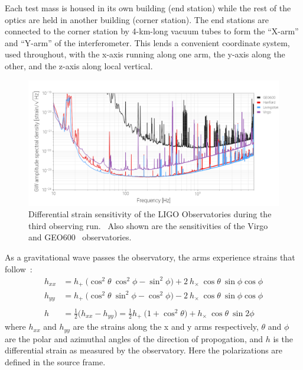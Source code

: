 \documentclass [12pt, proquest]{uwthesis}[2019]
\begin{document}
Each test mass is housed in its own building (end station) while the rest of the optics are held in another building (corner station). The end stations are connected to the corner station by 4-km-long vacuum tubes to form the ``X-arm'' and ``Y-arm'' of the interferometer. This lends a convenient coordinate system, used throughout, with the x-axis running along one arm, the y-axis along the other, and the z-axis along local vertical. 

\begin{figure}[!h]
\begin{center}
\includegraphics[width=1.05\textwidth]{LIGOSens.png}
\caption[Differential strain sensitivity of the LIGO and Virgo Observatories]{Differential strain sensitivity of the LIGO Observatories during the third observing run.~\cite{LIGOopen} Also shown are the sensitivities of the Virgo~\cite{virgo} and GEO600~\cite{geo} observatories.}
\label{LIGO_Strain}
\end{center}
\end{figure}

As a gravitational wave passes the observatory, the arms experience strains that follow~\cite{GWBook}:
\begin{align}
h_{xx}&=h_+\ \big( \cos^2\theta\ \cos^2\phi-\sin^2\phi \big)+2\ h_\times\ \cos \theta\ \sin \phi \cos \phi \\
h_{yy}&=h_+\ \big( \cos^2\theta\ \sin^2\phi-\cos^2\phi \big)-2\ h_\times\ \cos \theta\ \sin \phi \cos \phi \\
\nonumber \\
h&=\frac{1}{2} \big( h_{xx}-h_{yy} \big)=\frac{1}{2}h_+\ \big( 1+\cos^2\theta \big)+ h_\times\ \cos \theta\ \sin 2 \phi 
\end{align}
where $h_{xx}$ and $h_{yy}$ are the strains along the x and y arms respectively, $\theta$ and $\phi$ are the polar and azimuthal angles of the direction of propogation, and $h$ is the differential strain as measured by the observatory. Here the polarizations are defined in the source frame.
\end{document}
